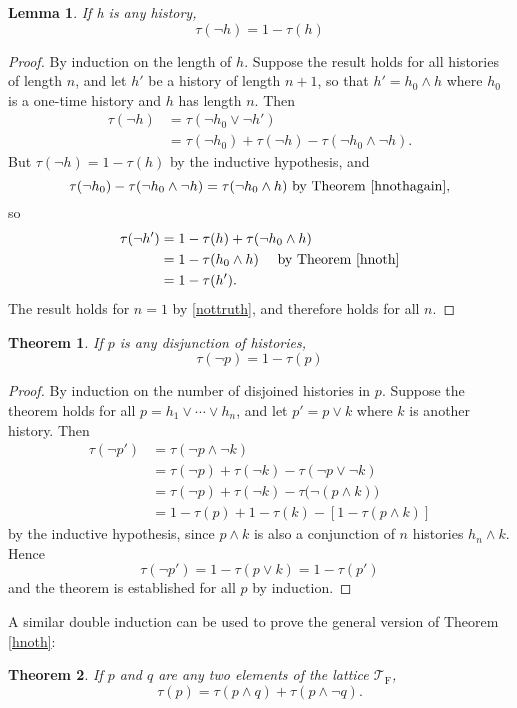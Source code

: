 \documentclass[12pt,reqno]{article}
\newcommand{\upline}{\vspace{-1.2\abovedisplayskip}}
\renewcommand{\(}{\left(}
\renewcommand{\)}{\right)}
\newcommand{\TF}{\mathcal{T}_\text{F}}
\newcommand{\<}{\langle}
\renewcommand{\>}{\rangle}
\theoremstyle{plain} %
\newtheorem{thm}{Theorem}
\newtheorem{lemma}{Lemma}
\begin{document}
\begin{lemma}
If h is any history,
\[
\tau(\lnot h) = 1 - \tau(h)
\]
\end{lemma}
\begin{proof}
By induction on the length of $h$. Suppose the result holds for all histories of length $n$, and let $h'$ be a history of length $n+1$, so that $h' = h_0\land h$ where $h_0$ is a one-time history and $h$ has length $n$. Then
\begin{align*}
\tau(\lnot h) &= \tau(\lnot h_0\lor\lnot h')\\ 
&= \tau(\lnot h_0) + \tau(\lnot h) - \tau(\lnot h_0 \land\lnot h).
\end{align*}
But $\tau(\lnot h) = 1 - \tau(h)$ by the inductive hypothesis, and
\[
\tau(\lnot h_0) - \tau(\lnot h_0\land\lnot h) = \tau(\lnot h_0\land h) \text{ by Theorem \ref{hnothagain},}
\]
so\upline
\begin{align*}
\tau(\lnot h') &= 1 - \tau(h) + \tau(\lnot h_0\land h)\\
&= 1 - \tau(h_0\land h) \quad\text{ by Theorem \ref{hnoth}}\\
&= 1 - \tau(h').
\end{align*}
The result holds for $n = 1$ by \eqref{nottruth}, and therefore holds for all $n$.
\end{proof}

\begin{thm}
If $p$ is any disjunction of histories,
\[
\tau(\lnot p) = 1- \tau(p)
\]
\end{thm}
\begin{proof}
By induction on the number of disjoined histories in $p$. Suppose the theorem holds for all $p = h_1\lor\cdots\lor h_n$, and let $p' = p\lor k$ where $k$ is another history. Then
\begin{align*}
\tau(\lnot p') &= \tau(\lnot p \land \lnot k)\\
&= \tau(\lnot p) + \tau(\lnot k) - \tau(\lnot p\lor\lnot k)\\
&= \tau(\lnot p) + \tau(\lnot k) - \tau\big(\lnot(p\land k)\big)\\
&= 1 - \tau(p) + 1 - \tau(k) - [1 - \tau(p\land k)]
\end{align*}
by the inductive hypothesis, since $p\land k$ is also a conjunction of $n$ histories $h_n\land k$. Hence
\[
\tau(\lnot p') = 1 - \tau(p\lor k) = 1 - \tau(p')
\]
and the theorem is established for all $p$ by induction.
\end{proof}

A similar double induction can be used to prove the general version of Theorem \ref{hnoth}:
\begin{thm}\label{pnotq}
If $p$ and $q$ are any two elements of the lattice $\TF$,
\[
\tau(p) = \tau(p\land q) + \tau(p\land\lnot q).
\]
\end{thm}
\end{document}
